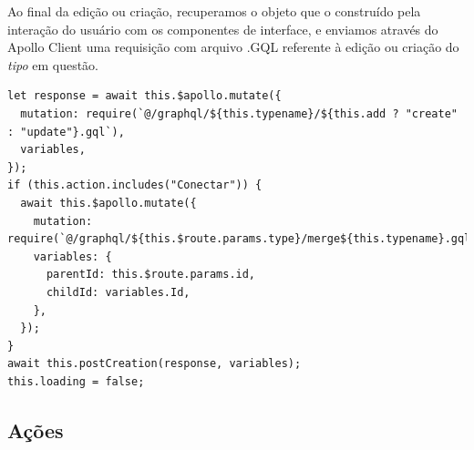 Ao final da edição ou criação, recuperamos o objeto que o construído pela interação do usuário com os componentes de interface, e enviamos através do Apollo Client uma requisição com arquivo .GQL referente à edição ou criação do \textit{tipo} em questão.

\begin{lstlisting}
let response = await this.$apollo.mutate({
  mutation: require(`@/graphql/${this.typename}/${this.add ? "create" : "update"}.gql`),
  variables,
});
if (this.action.includes("Conectar")) {
  await this.$apollo.mutate({
    mutation: require(`@/graphql/${this.$route.params.type}/merge${this.typename}.gql`),
    variables: {
      parentId: this.$route.params.id,
      childId: variables.Id,
    },
  });
}
await this.postCreation(response, variables);
this.loading = false;
\end{lstlisting}

\subsection{Ações}


